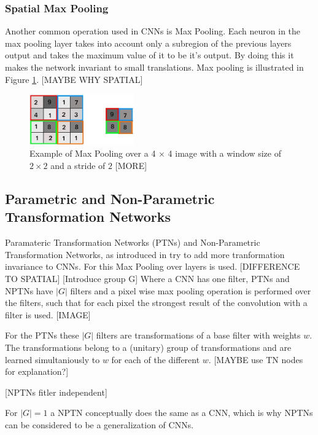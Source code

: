 \documentclass{llncs}
\begin{document}
\subsubsection{Spatial Max Pooling}
Another common operation used in CNNs is Max Pooling.
Each neuron in the max pooling layer takes into account only a subregion of the previous
layers output and takes the maximum value of it to be it's output. By doing this it makes the network invariant to small translations. Max pooling is illustrated in Figure \ref{fig:maxpooling}. [MAYBE WHY SPATIAL]

\begin{figure}
	\begin{center}
		\includegraphics[width=0.40\textwidth]{result_images/maxpooling.jpg}
		\caption{Example of Max Pooling over a 4 $\times$ 4 image with a window size of $2 \times 2$ and a stride of $2$ [MORE]}
		\label{fig:maxpooling}
	\end{center}
\end{figure}

\subsection{Parametric and Non-Parametric Transformation Networks}

Paramateric Transformation Networks (PTNs) and Non-Parametric Transformation Networks, as introduced in \cite{NPTN} try to add more tranformation invariance to CNNs. For this Max Pooling over layers is used. [DIFFERENCE TO SPATIAL]
[Introduce group G]
Where a CNN has one filter, PTNs and NPTNs have $|G|$ filters and a pixel wise max pooling operation is performed over the filters, such that for each pixel the strongest result of the convolution with a filter is used. [IMAGE]

For the PTNs these $|G|$ filters are transformations of a base filter with weights $w$. The transformations belong to a (unitary) group of transformations and are learned simultaniously to $w$ for each of the different $w$. [MAYBE use TN nodes for explanation?]

[NPTNs fitler independent]

For $|G|=1$ a NPTN conceptually does the same as a CNN, which is why NPTNs can be considered to be a generalization of CNNs. 
\end{document}
